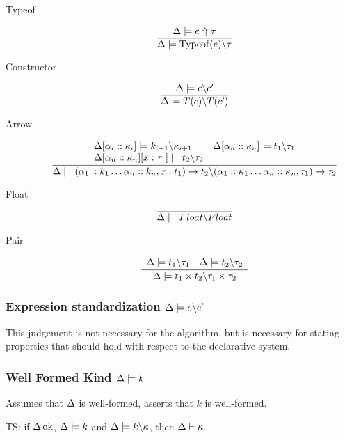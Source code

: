 \documentclass[12pt,twoside,fleqn]{amsart}
\theoremstyle{plain}
\theoremstyle{plain}
\theoremstyle{definition}
\begin{document}
\begin{description}
\item [Typeof]
\[
\frac{\Delta  \models e \Uparrow \tau  }{\Delta  \models \mathrm{Typeof}(e ) \backslash \tau  }\]

\item [Constructor]
\[
\frac{\Delta  \models c \backslash c' }{\Delta  \models T(c) \backslash T(c') }\]

\item [Arrow]
\[
\frac{\begin{array}{ll}
\Delta  [\alpha _{i}  ::\kappa _{i}  ] \models k_{i+1} \backslash \kappa _{i+1} & \Delta  [\alpha _{n}  ::\kappa _{n}  ] \models t_{1} \backslash \tau _{1}\\
\Delta  [\alpha _{n}  ::\kappa _{n}  ][x :\tau _{1} ] \models t_{2} \backslash \tau _{2} & 
\end{array} }{\Delta  \models (\alpha _{1}::k_{1}\ldots \alpha _{n}::k_{n},x:t_{1})\rightarrow t_{2} \backslash (\alpha _{1}::\kappa _{1}\ldots \alpha _{n}::\kappa _{n},\tau _{1})\rightarrow \tau _{2} }\]

\item [Float]
\[
\overline{\Delta  \models Float \backslash Float }\]

\item [Pair]
\[
\frac{\begin{array}{ll}
\Delta  \models t_{1} \backslash \tau _{1} & \Delta  \models t_{2} \backslash \tau _{2}
\end{array} }{\Delta  \models t_{1}\times t_{2} \backslash \tau _{1}\times \tau _{2} }\]

\end{description}

\subsubsection{Expression standardization \protect\( \Delta  \models e \backslash e'\protect \)}

This judgement is not necessary for the algorithm, but is necessary for stating
properties that should hold with respect to the declarative system. 


\subsubsection{Well Formed Kind \protect\( \Delta  \models k\protect \)}

Assumes that \( \Delta  \) is well-formed, asserts that \( k \) is well-formed. 

TS: if \( \Delta  \, \mathrm{ok} \), \( \Delta  \models k \) and \( \Delta  \models k \backslash \kappa  \),
then \( \Delta  \vdash \kappa  \).
\end{document}
